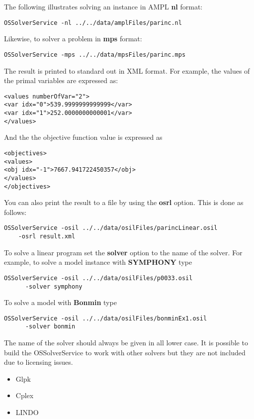 \documentclass[11pt]{article}
\renewcommand{\_}{{\char"5F}}
\renewcommand{\{}{{\char"7B}}
\renewcommand{\}}{{\char"7D}}
\renewcommand{\^}{{\char"0D}}
\renewcommand{\'}{{\char"0D}}
\begin{document}
The following illustrates solving an instance in AMPL {\bf nl} format:

\begin{verbatim}
OSSolverService -nl ../../data/amplFiles/parinc.nl
\end{verbatim}

Likewise, to solver a problem in {\bf mps} format:

\begin{verbatim}
OSSolverService -mps ../../data/mpsFiles/parinc.mps
\end{verbatim}


The result is printed to standard out in XML format. For example, the values of the primal variables are expressed as:

\begin{verbatim}
<values numberOfVar="2">
<var idx="0">539.9999999999999</var>
<var idx="1">252.0000000000001</var>
</values>
\end{verbatim}
And the the objective function value is expressed as
\begin{verbatim}
<objectives>
<values>
<obj idx="-1">7667.941722450357</obj>
</values>
</objectives>
\end{verbatim}
You can also print the result to a file by using the {\bf osrl} option. This is done as follows:
{\small
\begin{verbatim}
OSSolverService -osil ../../data/osilFiles/parincLinear.osil 
    -osrl result.xml
\end{verbatim}
}


To solve a linear program set the {\bf solver} option to the name of the solver. For example, to solve a model instance with {\bf SYMPHONY} type

{\small
\begin{verbatim}
OSSolverService -osil ../../data/osilFiles/p0033.osil 
      -solver symphony
\end{verbatim}
}
To solve a model with {\bf Bonmin} type
{\small
\begin{verbatim}
OSSolverService -osil ../../data/osilFiles/bonminEx1.osil 
      -solver bonmin
\end{verbatim}
}
The name of the solver should always be given in all lower case.  It is possible to build the OSSolverService to work with other solvers but they are not included due to licensing issues.


\begin{itemize}

 \item Glpk 

 \item Cplex 

 \item LINDO

\end{itemize}
\end{document}
